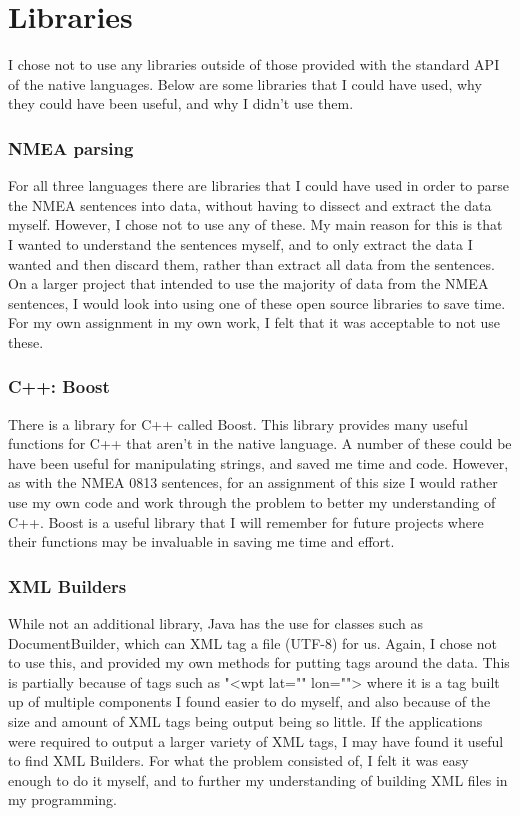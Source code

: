 \documentclass{article}
\begin{document}

\section{Libraries}

I chose not to use any libraries outside of those provided with the standard API of the native languages. Below are some libraries that I could have used, why they could have been useful, and why I didn't use them.

\subsubsection{NMEA parsing}
For all three languages there are libraries that I could have used in order to parse the NMEA sentences into data, without having to dissect and extract the data\cite{nmeajava}\cite{nmeacplusplus} myself. However, I chose not to use any of these. My main reason for this is that I wanted to understand the sentences myself, and to only extract the data I wanted and then discard them, rather than extract all data from the sentences. On a larger project that intended to use the majority of data from the NMEA sentences, I would look into using one of these open source libraries to save time. For my own assignment in my own work, I felt that it was acceptable to not use these.

\subsubsection{C++: Boost}
There is a library for C++ called Boost\cite{boost}. This library provides many useful functions for C++ that aren't in the native language. A number of these could be have been useful for manipulating strings, and saved me time and code. However, as with the NMEA 0813 sentences, for an assignment of this size I would rather use my own code and work through the problem to better my understanding of C++. Boost is a useful library that I will remember for future projects where their functions may be invaluable in saving me time and effort.

\subsubsection{XML Builders}
While not an additional library, Java has the use for classes such as DocumentBuilder, which can XML tag a file (UTF-8) for us. Again, I chose not to use this, and provided my own methods for putting tags around the data. This is partially because of tags such as "<wpt lat="" lon=""> where it is a tag built up of multiple components I found easier to do myself, and also because of the size and amount of XML tags being output being so little. If the applications were required to output a larger variety of XML tags, I may have found it useful to find XML Builders. For what the problem consisted of, I felt it was easy enough to do it myself, and to further my understanding of building XML files in my programming.
\end{document}

